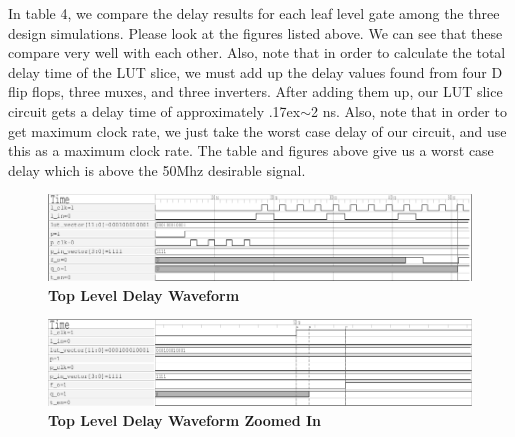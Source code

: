 \documentclass[a4paper]{article}
\begin{document}
    In table 4, we compare the delay results for each leaf level gate among the three design simulations.
    Please look at the figures listed above. We can see that these compare very well with each other. Also,
    note that in order to calculate the total delay time of the LUT slice, we must add up the delay values
    found from four D flip flops, three muxes, and three inverters. After adding them up, our LUT slice circuit
    gets a delay time of approximately {\raise.17ex\hbox{$\scriptstyle\sim$}}2 ns. Also, note that in order to get maximum clock rate, we just take
    the worst case delay of our circuit, and use this as a maximum clock rate. The table and figures above
    give us a worst case delay which is above the 50Mhz desirable signal.

    \begin{figure}[H]
        \centering
        \includegraphics[width=\textwidth,height=\textheight,keepaspectratio]{../../vhdl/delay_waveforms/top_delay_wf.png}
        \caption{\textbf{Top Level Delay Waveform}}
        \label{fig:gg}
    \end{figure}
    \begin{figure}[H]
        \centering
        \includegraphics[width=\textwidth,height=\textheight,keepaspectratio]{../../vhdl/delay_waveforms/top_delay.png}
        \caption{\textbf{Top Level Delay Waveform Zoomed In}}
        \label{fig:gg}
    \end{figure}
\end{document}
